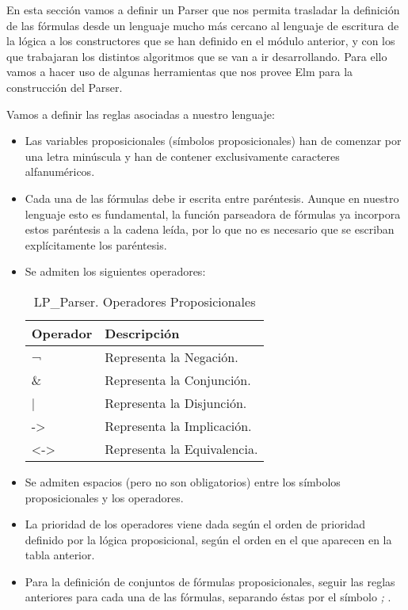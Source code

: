 \documentclass[a4paper]{report}
\begin{document}
En esta sección vamos a definir un Parser que nos permita trasladar la definición de las fórmulas desde un lenguaje mucho más cercano al lenguaje de escritura de la lógica a los constructores que se han definido en el módulo anterior, y con los que trabajaran los distintos algoritmos que se van a ir desarrollando. Para ello vamos a hacer uso de algunas herramientas que nos provee Elm para la construcción del Parser.

Vamos a definir las reglas asociadas a nuestro lenguaje:

\begin{itemize}
\item Las variables proposicionales (símbolos proposicionales) han de comenzar por una letra minúscula y han de contener exclusivamente caracteres alfanuméricos.

\item Cada una de las fórmulas debe ir escrita entre paréntesis. Aunque en nuestro lenguaje esto es fundamental, la función parseadora de fórmulas ya incorpora estos paréntesis a la cadena leída, por lo que no es necesario que se escriban explícitamente los paréntesis.

\item Se admiten los siguientes operadores:

\begin{table}[H]
\centering
\begin{tabular}{P{3cm} p{5cm}}
\hline
Operador & Descripción\\
\hline
\hline
¬ & Representa la Negación.\\
\hline
\& & Representa la Conjunción.\\
\hline
| & Representa la Disjunción.\\
\hline
-> & Representa la Implicación.\\
\hline
<-> & Representa la Equivalencia.\\
\hline
\end{tabular}
\caption{LP\_Parser. Operadores Proposicionales}
\end{table}

\item Se admiten espacios (pero no son obligatorios) entre los símbolos proposicionales y los operadores.

\item La prioridad de los operadores viene dada según el orden de prioridad definido por la lógica proposicional, según el orden en el que aparecen en la tabla anterior.

\item Para la definición de conjuntos de fórmulas proposicionales, seguir las reglas anteriores para cada una de las fórmulas, separando éstas por el símbolo \textit{;} .
\end{itemize}
\end{document}
